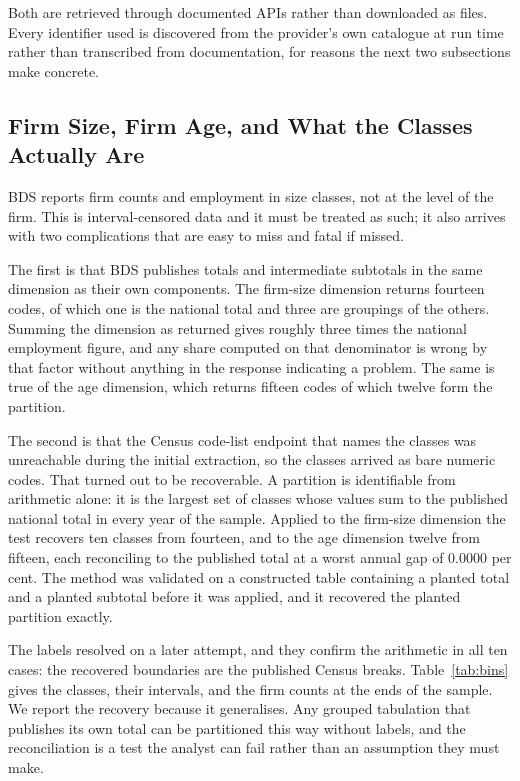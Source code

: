 \documentclass[jrfm,article,submit,pdftex,moreauthors]{Definitions/mdpi}
\begin{document}
Both are retrieved through documented APIs rather than downloaded as files. Every identifier
used is discovered from the provider's own catalogue at run time rather than transcribed
from documentation, for reasons the next two subsections make concrete.



\subsection{Firm Size, Firm Age, and What the Classes Actually Are}
\label{subsec:partition}

BDS reports firm counts and employment in size classes, not at the level of the firm. This
is interval-censored data and it must be treated as such; it also arrives with two
complications that are easy to miss and fatal if missed.

The first is that BDS publishes totals and intermediate subtotals in the same dimension as
their own components. The firm-size dimension returns fourteen codes, of which one is the
national total and three are groupings of the others. Summing the dimension as returned
gives roughly three times the national employment figure, and any share computed on that
denominator is wrong by that factor without anything in the response indicating a problem.
The same is true of the age dimension, which returns fifteen codes of which twelve form the
partition.

The second is that the Census code-list endpoint that names the classes was unreachable
during the initial extraction, so the classes arrived as bare numeric codes. That turned out
to be recoverable. A partition is identifiable from arithmetic alone: it is the largest set
of classes whose values sum to the published national total in every year of the sample.
Applied to the firm-size dimension the test recovers ten classes from fourteen, and to the
age dimension twelve from fifteen, each reconciling to the published total at a worst annual
gap of 0.0000 per cent. The method was validated on a constructed table containing a planted
total and a planted subtotal before it was applied, and it recovered the planted partition
exactly.

The labels resolved on a later attempt, and they confirm the arithmetic in all ten cases:
the recovered boundaries are the published Census breaks. Table~\ref{tab:bins} gives the
classes, their intervals, and the firm counts at the ends of the sample. We report the
recovery because it generalises. Any grouped tabulation that publishes its own total can be
partitioned this way without labels, and the reconciliation is a test the analyst can fail
rather than an assumption they must make.
\end{document}
